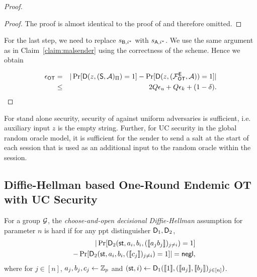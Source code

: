 \begin{proof}
\begin{proof}
The proof is almost identical to the proof of  and therefore omitted.
\pe
\end{proof}

For the last step, we need to replace $s_{\mathsf{B},i^*}$ with $s_{\mathsf{A},i^*}$. We use the same argument as in Claim~\ref{claim:malsender} using the correctness of the scheme. Hence we obtain

\begin{eqnarray*}
\epsilon_{\mathsf{OT}} &=&|\Pr[\mathsf D(z,(\mathsf{S}, \mathcal{A})_{\Pi})=1] -\Pr[\mathsf D(z,(\mathcal{F}_{\mathsf{OT}}^\mathsf{E},\mathcal{A}))=1]|\\
&\leq &2Q\epsilon_{u}+Q\epsilon_{k}+(1-\delta).
\end{eqnarray*}
\pe
\end{proof}


\begin{remark}
For stand alone security, security of \UKA against uniform adversaries is sufficient, i.e. auxiliary input $z$ is the empty string. Further, for UC security in the global random oracle model, it is sufficient for the sender to send a salt at the start of each session that is used as an additional input to the random oracle within the session. 
\end{remark}







\subsection{Diffie-Hellman based One-Round Endemic OT with UC Security }\label{sec:ddhProof}



\begin{definition}\label{def:CODDH}
	For a group $\mathcal{G}$, the \emph{choose-and-open decisional Diffie-Hellman} assumption for parameter $n$ is hard if for any ppt distinguisher $\mathsf D_1,\mathsf D_2$,
	\begin{eqnarray*}
		&&|\Pr[ \mathsf D_2(\mathsf{st},a_i,b_i,(\llbracket a_{j}b_{j}\rrbracket)_{j\neq i})=1]\\
		&&-\Pr[ \mathsf D_2(\mathsf{st},a_i,b_i,(\llbracket c_{j}\rrbracket)_{j\neq i})=1]|=\mathsf{negl},
	\end{eqnarray*}
	where for $j\in[n]$, $a_j,b_j,c_j\leftarrow\mathbb Z_p$ and $(\mathsf{st}, i)\leftarrow\mathsf D_1(\llbracket 1\rrbracket, (\llbracket a_j\rrbracket,\llbracket b_j\rrbracket)_{j\in [n]})$.
\end{definition}

